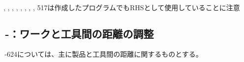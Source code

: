 \begin{marker}
, , , , , , , , \ttNum517は作成したプログラムでもRHSとして使用していることに注意
\end{marker}



\clearpage


\subsection{\,-：ワークと工具間の距離の調整}
\,-\ttNum624については、主に製品と工具間の距離に関するものとする。\\

